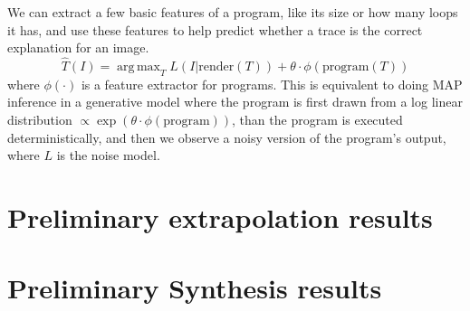 \documentclass{article}
\DeclareMathOperator*{\argmax}{arg\,max} %
\DeclareMathOperator{\argmax}{argmax} %
\begin{document}
We can extract a few basic features of a program, like its size or how many
loops it has,
and use these features to help predict
whether a trace is the correct explanation for an image.
\begin{equation}
\hat{T}(I) = \argmax_{T} L(I | \text{render}(T)) + \theta\cdot  \phi \left( \text{program}(T) \right)
\end{equation}
where $\phi (\cdot)$ is a feature extractor for programs.
This is equivalent to doing MAP inference in a generative model where the program
is first drawn from a log linear distribution $\propto \exp (\theta\cdot \phi (\text{program}))$,
than the program is executed deterministically,
and then we observe a noisy version of the program's output,
where $L$ is the noise model.



  \pagebreak
  \section{Preliminary extrapolation results} 



\pagebreak
  \section{Preliminary Synthesis results} 




{\small }
\end{document}
